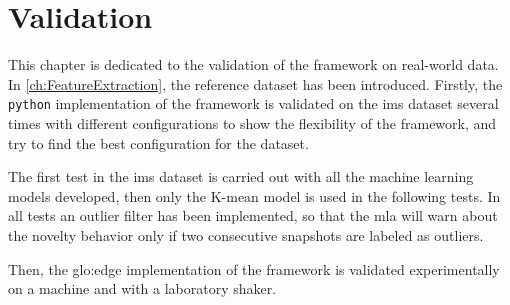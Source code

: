 \chapter{Validation}
\label{sec:Validation}

This chapter is dedicated to the validation of the framework on real-world data. In \autoref{ch:FeatureExtraction}, the reference dataset \cite{lee2007bearingdataset} has been introduced. Firstly, the \texttt{python} implementation of the framework is validated on the \gls{ims} dataset several times with different configurations to show the flexibility of the framework, and try to find the best configuration for the dataset. 

The first test in the \gls{ims} dataset is carried out with all the machine learning models developed, then only the K-mean model is used in the following tests. In all tests an outlier filter has been implemented, so that the \gls{mla} will warn about the novelty behavior only if two consecutive snapshots are labeled as outliers. 

Then, the \gls{glo:edge} implementation of the framework is validated experimentally on a machine and with a laboratory shaker.



\maskongoig{




}